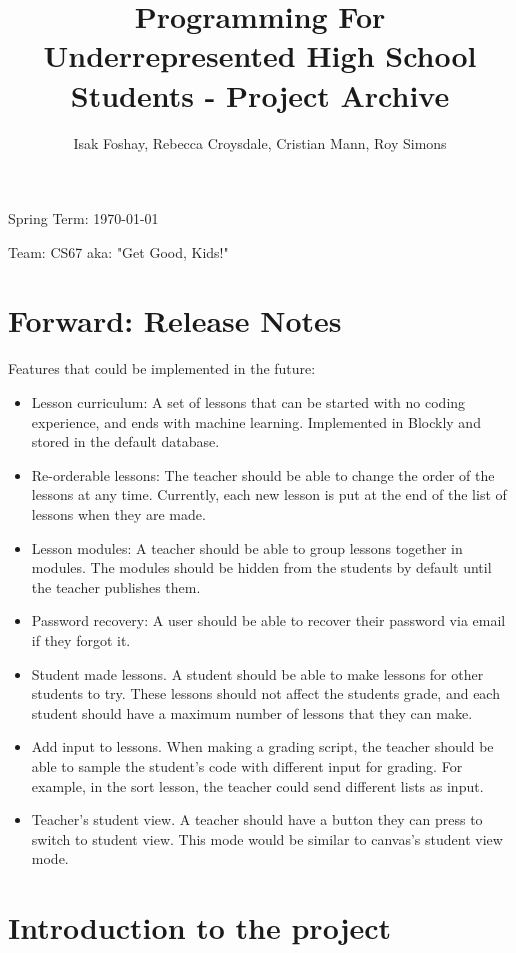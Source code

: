 \documentclass[draftclsnofoot,10pt,onecolumn]{IEEEtran}
\title{Programming For Underrepresented High School Students - Project Archive}
\author{Isak Foshay, Rebecca Croysdale, Cristian Mann, Roy Simons}
\begin{document}
\maketitle
\begin{center} Spring Term: \today \end{center}
\begin{center} Team: CS67 aka: "Get Good, Kids!"\end{center}

\newpage
\tableofcontents

\newpage
\section{Forward: Release Notes}
Features that could be implemented in the future:
\begin{itemize}
\item{Lesson curriculum: A set of lessons that can be started with no coding experience, and ends with machine learning. Implemented in Blockly and stored in the default database.}
\item{Re-orderable lessons: The teacher should be able to change the order of the lessons at any time. Currently, each new lesson is put at the end of the list of lessons when they are made.}
\item{Lesson modules: A teacher should be able to group lessons together in modules. The modules should be hidden from the students by default until the teacher publishes them.}
\item{Password recovery: A user should be able to recover their password via email if they forgot it.}
\item{Student made lessons. A student should be able to make lessons for other students to try. These lessons should not affect the students grade, and each student should have a maximum number of lessons that they can make.}
\item{Add input to lessons. When making a grading script, the teacher should be able to sample the student's code with different input for grading. For example, in the sort lesson, the teacher could send different lists as input.}
\item{Teacher's student view. A teacher should have a button they can press to switch to student view. This mode would be similar to canvas's student view mode.}
\end{itemize}

\section{Introduction to the project}
\end{document}
